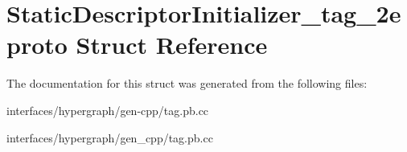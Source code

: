 \hypertarget{structStaticDescriptorInitializer__tag__2eproto}{
\section{StaticDescriptorInitializer\_\-tag\_\-2eproto Struct Reference}
\label{structStaticDescriptorInitializer__tag__2eproto}
}


The documentation for this struct was generated from the following files:\begin{DoxyCompactItemize}
\item 
interfaces/hypergraph/gen-\/cpp/tag.pb.cc\item 
interfaces/hypergraph/gen\_\-cpp/tag.pb.cc\end{DoxyCompactItemize}

